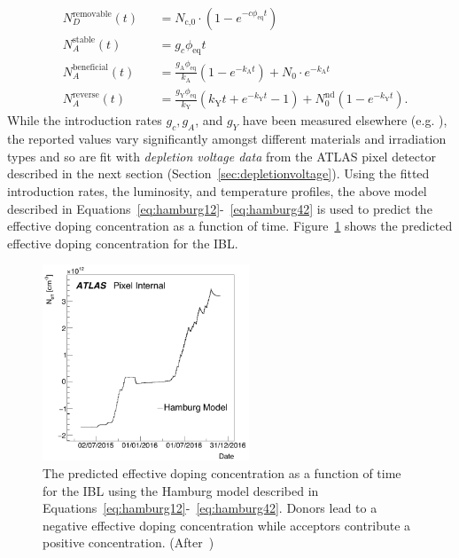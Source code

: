 \begin{align}
\label{eq:hamburg12}
&N_{D}^\text{removable}(t) &&=N_\text{c,0}\cdot \left( 1-e^{-c\phi_\text{eq}t} \right) \\ \label{eq:hamburg22}
&N_{A}^\text{stable}(t) &&= g_c \phi_\text{eq}t \\ \label{eq:hamburg32}
&N_{A}^\text{beneficial}(t)  &&=\frac{g_\text{A}\phi_\text{eq}}{k_\text{A}} \left( 1-e^{-k_\text{A}t} \right) + N_0 \cdot e^{-k_\text{A}t} \\ \label{eq:hamburg42}
&N_{A}^\text{reverse}(t)  &&= \frac{g_\text{Y}\phi_\text{eq}}{k_\text{Y}} \left( k_\text{Y}t + e^{-k_\text{Y}t} -1  \right) + N_0^\text{nd} \left( 1-e^{-k_\text{Y}t} \right).
\end{align}
While the introduction rates $g_c,g_A$, and $g_Y$ have been measured elsewhere (e.g. \cite{Lindstrom:421210}), the reported values vary significantly amongst different materials and irradiation types and so are fit with \textit{depletion voltage data} from the ATLAS pixel detector described in the next section (Section~\ref{sec:depletionvoltage}).  Using the fitted introduction rates, the luminosity, and temperature profiles, the above model described in Equations~\ref{eq:hamburg12}-~\ref{eq:hamburg42} is used to predict the effective doping concentration as a function of time.  Figure~\ref{fig:electricfield:neff} shows the predicted effective doping concentration for the IBL. 

\begin{figure}[!htpb]
\centering
\includegraphics[width=0.55\textwidth]{newneff_added.pdf}
\caption{The predicted effective doping concentration as a function of time for the IBL using the Hamburg model described in Equations~\ref{eq:hamburg12}-~\ref{eq:hamburg42}. Donors lead to a negative effective doping concentration while acceptors contribute a positive concentration.  (After~\cite{Benoit:2255825})}
\label{fig:electricfield:neff}
\end{figure}



